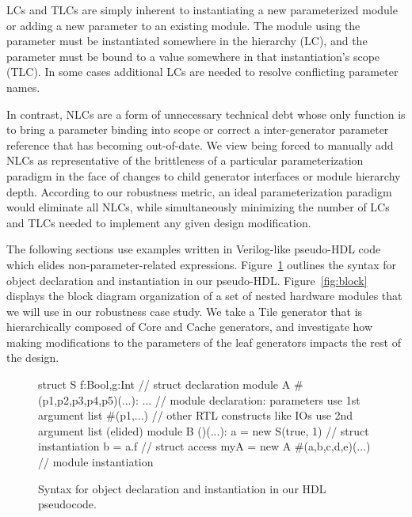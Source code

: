 LCs and TLCs are simply inherent to instantiating a new parameterized module or adding a new parameter to an existing module.
The module using the parameter must be instantiated somewhere in the hierarchy (LC), and the parameter must be bound to a value
somewhere in that instantiation's scope (TLC).
In some cases additional LCs are needed to resolve conflicting parameter names.

In contrast, NLCs are a form of unnecessary technical debt whose only function is to bring a parameter binding into scope
or correct a inter-generator parameter reference that has becoming out-of-date.
We view being forced to manually add NLCs as representative of
the brittleness of a particular parameterization paradigm in the face of changes to child generator interfaces
or module hierarchy depth.
According to our robustness metric, an ideal parameterization paradigm would eliminate all NLCs,
while simultaneously minimizing the number of LCs and TLCs needed to implement any given design modification.


The following sections use examples written in Verilog-like pseudo-HDL code which elides non-parameter-related expressions.
Figure~\ref{fig:phdl} outlines the syntax for object declaration and instantiation in our pseudo-HDL.
Figure~\ref{fig:block} displays the block diagram organization of a set of nested hardware modules that we will use in our robustness case study.
We take a Tile generator that is hierarchically composed of Core and Cache generators, and investigate how making modifications to the parameters
of the leaf generators impacts the rest of the design.

\begin{figure}
\centering
\begin{phdl}
struct S {f:Bool,g:Int}          // struct declaration
module A #(p1,p2,p3,p4,p5)(...): ... 
   // module declaration: parameters use 1st argument list #(p1,...)
   // other RTL constructs like IOs use 2nd argument list (elided)
module B ()(...):
  a = new S(true, 1)             // struct instantiation
  b = a.f                        // struct access
  myA = new A #(a,b,c,d,e)(...)  // module instantiation
\end{phdl} 
\caption{Syntax for object declaration and instantiation in our HDL pseudocode.}
\label{fig:phdl}
\end{figure}

